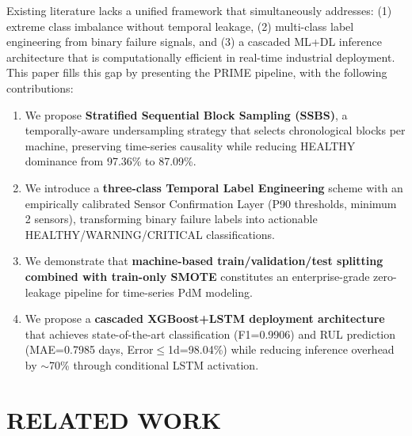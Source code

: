 \documentclass[conference]{IEEEtran}
\begin{document}
Existing literature \cite{li2025comparison, elkateb2024machine, bitam2025aiot} lacks a unified framework that simultaneously addresses: (1) extreme class imbalance without temporal leakage, (2) multi-class label engineering from binary failure signals, and (3) a cascaded ML+DL inference architecture that is computationally efficient in real-time industrial deployment. This paper fills this gap by presenting the PRIME pipeline, with the following contributions:

\begin{enumerate}
\item We propose \textbf{Stratified Sequential Block Sampling (SSBS)}, a temporally-aware undersampling strategy that selects chronological blocks per machine, preserving time-series causality while reducing HEALTHY dominance from 97.36\% to 87.09\%.
\item We introduce a \textbf{three-class Temporal Label Engineering} scheme with an empirically calibrated Sensor Confirmation Layer (P90 thresholds, minimum 2 sensors), transforming binary failure labels into actionable HEALTHY/WARNING/CRITICAL classifications.
\item We demonstrate that \textbf{machine-based train/validation/test splitting combined with train-only SMOTE} constitutes an enterprise-grade zero-leakage pipeline for time-series PdM modeling.
\item We propose a \textbf{cascaded XGBoost+LSTM deployment architecture} that achieves state-of-the-art classification (F1=0.9906) and RUL prediction (MAE=0.7985 days, Error$\leq$1d=98.04\%) while reducing inference overhead by $\sim$70\% through conditional LSTM activation.
\end{enumerate}

\section{RELATED WORK}
\end{document}

